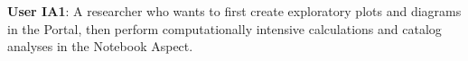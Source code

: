 { \bf User IA1}: A researcher who wants to first create exploratory plots and diagrams in the Portal, then perform computationally intensive calculations and catalog analyses in the Notebook Aspect. 
